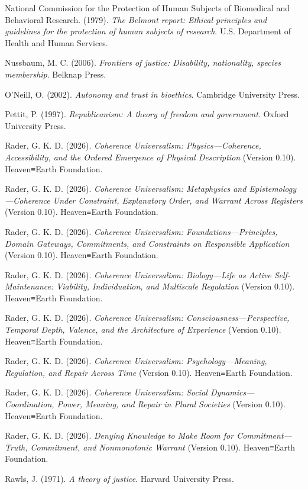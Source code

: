 \documentclass[
  11pt,
]{article}
\begin{document}
National Commission for the Protection of Human Subjects of Biomedical
and Behavioral Research. (1979). \emph{The Belmont report: Ethical
principles and guidelines for the protection of human subjects of
research}. U.S. Department of Health and Human Services.

Nussbaum, M. C. (2006). \emph{Frontiers of justice: Disability,
nationality, species membership}. Belknap Press.

O'Neill, O. (2002). \emph{Autonomy and trust in bioethics}. Cambridge
University Press.

Pettit, P. (1997). \emph{Republicanism: A theory of freedom and
government}. Oxford University Press.

Rader, G. K. D. (2026). \emph{Coherence Universalism:
Physics---Coherence, Accessibility, and the Ordered Emergence of
Physical Description} (Version 0.10). Heaven≡Earth Foundation.

Rader, G. K. D. (2026). \emph{Coherence Universalism: Metaphysics and
Epistemology---Coherence Under Constraint, Explanatory Order, and
Warrant Across Registers} (Version 0.10). Heaven≡Earth Foundation.

Rader, G. K. D. (2026). \emph{Coherence Universalism:
Foundations---Principles, Domain Gateways, Commitments, and Constraints
on Responsible Application} (Version 0.10). Heaven≡Earth Foundation.

Rader, G. K. D. (2026). \emph{Coherence Universalism: Biology---Life as
Active Self-Maintenance: Viability, Individuation, and Multiscale
Regulation} (Version 0.10). Heaven≡Earth Foundation.

Rader, G. K. D. (2026). \emph{Coherence Universalism:
Consciousness---Perspective, Temporal Depth, Valence, and the
Architecture of Experience} (Version 0.10). Heaven≡Earth Foundation.

Rader, G. K. D. (2026). \emph{Coherence Universalism:
Psychology---Meaning, Regulation, and Repair Across Time} (Version
0.10). Heaven≡Earth Foundation.

Rader, G. K. D. (2026). \emph{Coherence Universalism: Social
Dynamics---Coordination, Power, Meaning, and Repair in Plural Societies}
(Version 0.10). Heaven≡Earth Foundation.

Rader, G. K. D. (2026). \emph{Denying Knowledge to Make Room for
Commitment---Truth, Commitment, and Nonmonotonic Warrant} (Version
0.10). Heaven≡Earth Foundation.

Rawls, J. (1971). \emph{A theory of justice}. Harvard University Press.
\end{document}
